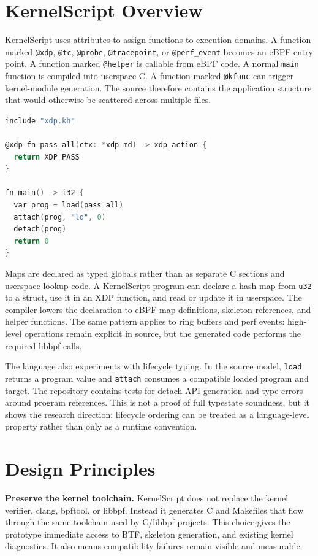 \documentclass[10pt,twocolumn]{article}
\newcommand{\tool}{KernelScript}
\begin{document}
\section{\tool{} Overview}

\tool{} uses attributes to assign functions to execution domains.  A function
marked \texttt{@xdp}, \texttt{@tc}, \texttt{@probe}, \texttt{@tracepoint}, or
\texttt{@perf\_event} becomes an eBPF entry point.  A function marked
\texttt{@helper} is callable from eBPF code.  A normal \texttt{main} function
is compiled into userspace C.  A function marked \texttt{@kfunc} can trigger
kernel-module generation.  The source therefore contains the application
structure that would otherwise be scattered across multiple files.

\begin{lstlisting}[language=C,caption={Minimal shape of a unified-source eBPF application.}]
include "xdp.kh"

@xdp fn pass_all(ctx: *xdp_md) -> xdp_action {
  return XDP_PASS
}

fn main() -> i32 {
  var prog = load(pass_all)
  attach(prog, "lo", 0)
  detach(prog)
  return 0
}
\end{lstlisting}

Maps are declared as typed globals rather than as separate C sections and
userspace lookup code.  A \tool{} program can declare a hash map from
\texttt{u32} to a struct, use it in an XDP function, and read or update it in
userspace.  The compiler lowers the declaration to eBPF map definitions,
skeleton references, and helper functions.  The same pattern applies to ring
buffers and perf events: high-level operations remain explicit in source, but
the generated code performs the required libbpf calls.

The language also experiments with lifecycle typing.  In the source model,
\texttt{load} returns a program value and \texttt{attach} consumes a compatible
loaded program and target.  The repository contains tests for detach API
generation and type errors around program references.  This is not a proof of
full typestate soundness, but it shows the research direction: lifecycle
ordering can be treated as a language-level property rather than only as a
runtime convention.

\section{Design Principles}

\textbf{Preserve the kernel toolchain.}  \tool{} does not replace the kernel
verifier, clang, bpftool, or libbpf.  Instead it generates C and Makefiles that
flow through the same toolchain used by C/libbpf projects.  This choice gives
the prototype immediate access to BTF, skeleton generation, and existing
kernel diagnostics.  It also means compatibility failures remain visible and
measurable.
\end{document}
